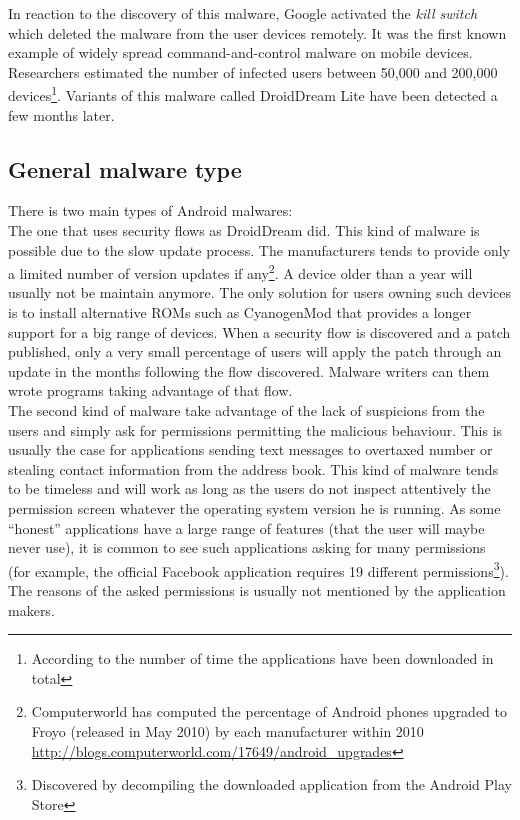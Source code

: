 In reaction to the discovery of this malware, Google activated the \emph{kill switch} which deleted the malware from the user devices remotely.
It was the first known example of widely spread command-and-control malware on mobile devices.
Researchers estimated the number of infected users between 50,000 and 200,000 devices\footnote{According to the number of time the applications have been downloaded in total}.
Variants of this malware called DroidDream Lite have been detected a few months later.

\subsection{General malware type}

There is two main types of Android malwares:\\

The one that uses security flows as DroidDream did.
This kind of malware is possible due to the slow update process.
The manufacturers tends to provide only a limited number of version updates if any\footnote{Computerworld has computed the percentage of Android phones upgraded to Froyo (released in May 2010) by each manufacturer within 2010 \url{http://blogs.computerworld.com/17649/android_upgrades}}.
A device older than a year will usually not be maintain anymore.
The only solution for users owning such devices is to install alternative ROMs such as CyanogenMod that provides a longer support for a big range of devices.
When a security flow is discovered and a patch published, only a very small percentage of users will apply the patch through an update in the months following the flow discovered.
Malware writers can them wrote programs taking advantage of that flow.\\

The second kind of malware take advantage of the lack of suspicions from the users and simply ask for permissions permitting the malicious behaviour.
This is usually the case for applications sending text messages to overtaxed number or stealing contact information from the address book.
This kind of malware tends to be timeless and will work as long as the users do not inspect attentively the permission screen whatever the operating system version he is running.
As some ``honest'' applications have a large range of features (that the user will maybe never use), it is common to see such applications asking for many permissions (for example, the official Facebook application requires 19 different permissions\footnote{Discovered by decompiling the downloaded application from the Android Play Store}).
The reasons of the asked permissions is usually not mentioned by the application makers.

